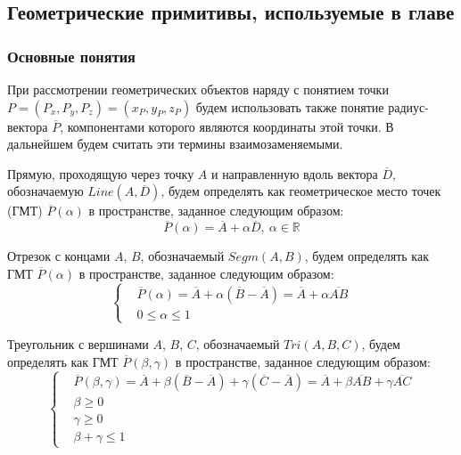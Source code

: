 \subsection{Геометрические примитивы, используемые в главе}

\subsubsection{Основные понятия}

При рассмотрении геометрических объектов наряду с понятием точки $P = (P_x, P_y, P_z) = (x_P, y_P, z_P)$ будем использовать также понятие радиус-вектора $\overline{P}$, компонентами которого являются координаты этой точки.
В дальнейшем будем считать эти термины взаимозаменяемыми.

Прямую, проходящую через точку $A$ и направленную вдоль вектора $\overline{D}$, обозначаемую $Line(A, \overline{D})$, будем определять как геометрическое место точек\label{term:gmt} (ГМТ\label{abbr:gmt}) $\overline{P}(\alpha)$ в пространстве, заданное следующим образом:
\begin{equation}\label{eqn:text_1_geo_prim_line}
	\overline{P}(\alpha) = \overline{A} + \alpha \overline{D}, \ \alpha \in \mathbb{R}
\end{equation}

Отрезок с концами $A$, $B$, обозначаемый $Segm(A, B)$, будем определять как ГМТ $\overline{P}(\alpha)$ в пространстве, заданное следующим образом:
\begin{equation}\label{eqn:text_1_geo_prim_segment}
	\left\{
		\begin{aligned}
			& \overline{P}(\alpha) = \overline{A} + \alpha (\overline{B} - \overline{A}) = \overline{A} + \alpha \overline{AB} \\
			& 0 \le \alpha \le 1
		\end{aligned}
	\right.
\end{equation}

Треугольник с вершинами $A$, $B$, $C$, обозначаемый $Tri(A, B, C)$, будем определять как ГМТ $\overline{P}(\beta, \gamma)$ в пространстве, заданное следующим образом:
\begin{equation}\label{eqn:text_1_geo_prim_triangle}
	\left\{
		\begin{aligned}
			& \overline{P}(\beta, \gamma) = \overline{A} + \beta (\overline{B} - \overline{A}) + \gamma (\overline{C} - \overline{A}) = \overline{A} + \beta \overline{AB} + \gamma \overline{AC} \\
			& \beta \ge 0 \\
			& \gamma \ge 0 \\
			& \beta + \gamma \le 1
		\end{aligned}
	\right.
\end{equation}

